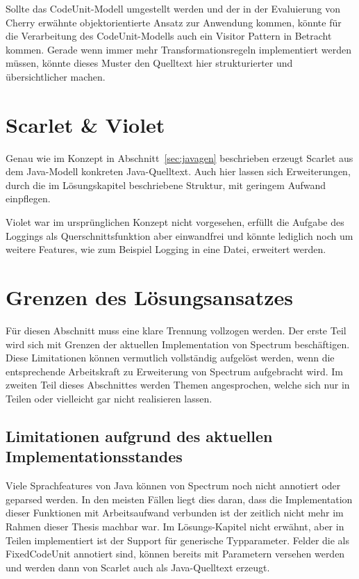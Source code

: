 \documentclass[12pt,oneside,a4paper,parskip]{scrbook}
\begin{document}
Sollte das CodeUnit-Modell umgestellt werden und der in der Evaluierung von Cherry erwähnte objektorientierte Ansatz zur Anwendung kommen, könnte für die Verarbeitung des CodeUnit-Modells auch ein Visitor Pattern in Betracht kommen. Gerade wenn immer mehr Transformationsregeln implementiert werden müssen, könnte dieses Muster den Quelltext hier strukturierter und übersichtlicher machen.

\section{Scarlet \& Violet}

Genau wie im Konzept in Abschnitt~\ref{sec:javagen} beschrieben erzeugt Scarlet aus dem Java-Modell konkreten Java-Quelltext. Auch hier lassen sich Erweiterungen, durch die im Lösungskapitel beschriebene Struktur, mit geringem Aufwand einpflegen.

Violet war im ursprünglichen Konzept nicht vorgesehen, erfüllt die Aufgabe des Loggings als Querschnittsfunktion aber einwandfrei und könnte lediglich noch um weitere Features, wie zum Beispiel Logging in eine Datei, erweitert werden.

\section{Grenzen des Lösungsansatzes}

Für diesen Abschnitt muss eine klare Trennung vollzogen werden. Der erste Teil wird sich mit Grenzen der aktuellen Implementation von Spectrum beschäftigen. Diese Limitationen können vermutlich vollständig aufgelöst werden, wenn die entsprechende Arbeitskraft zu Erweiterung von Spectrum aufgebracht wird. Im zweiten Teil dieses Abschnittes werden Themen angesprochen, welche sich nur in Teilen oder vielleicht gar nicht realisieren lassen.

\subsection{Limitationen aufgrund des aktuellen Implementationsstandes}

Viele Sprachfeatures von Java können von Spectrum noch nicht annotiert oder geparsed werden. In den meisten Fällen liegt dies daran, dass die Implementation dieser Funktionen mit Arbeitsaufwand verbunden ist der zeitlich nicht mehr im Rahmen dieser Thesis machbar war. Im Lösungs-Kapitel nicht erwähnt, aber in Teilen implementiert ist der Support für generische Typparameter. Felder die als FixedCodeUnit annotiert sind, können bereits mit Parametern versehen werden und werden dann von Scarlet auch als Java-Quelltext erzeugt.
\end{document}
